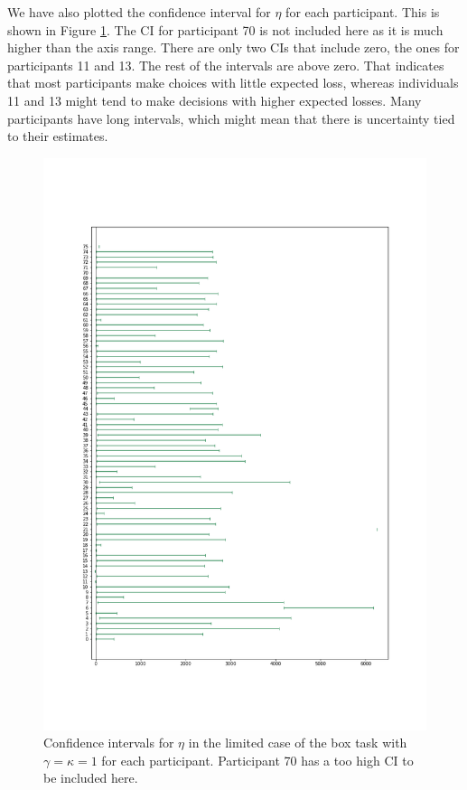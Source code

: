 We have also plotted the confidence interval for $\eta$ for each participant. This is shown in Figure \ref{fig:all_cis_eta_lim}. The CI for participant 70 is not included here as it is much higher than the axis range. There are only two CIs that include zero, the ones for participants 11 and 13. The rest of the intervals are above zero. That indicates that most participants make choices with little expected loss, whereas individuals 11 and 13 might tend to make decisions with higher expected losses. Many participants have long intervals, which might mean that there is uncertainty tied to their estimates. 
\begin{figure}
    \centering
    \includegraphics[scale=0.37]{pictures/all_cis_lim_eta.png}
    \caption[CIs for $\eta$, limited. $\gamma=\kappa=1$]{Confidence intervals for $\eta$ in the limited case of the box task with $\gamma=\kappa=1$ for each participant. Participant 70 has a too high CI to be included here.}
    \label{fig:all_cis_eta_lim}
\end{figure}


